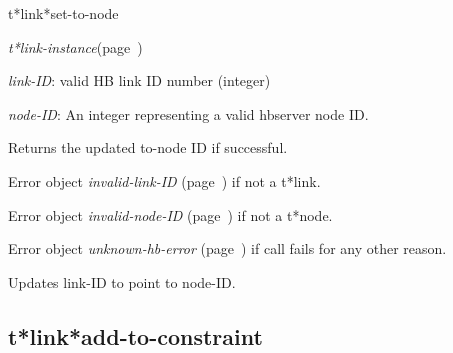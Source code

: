 \begin{description}
\item [Name:]  t*link*set-to-node

\item [Class:] {\sl t*link-instance}\hfill(page~\pageref{t*link-instance})

\item [Parameters:]
\item {\sl link-ID}:  
valid HB link ID number (integer)

\item {\sl node-ID}:   An integer representing
a valid hbserver node ID.


\item [Return-value:]
Returns the updated to-node ID if successful.

Error object {\sl invalid-link-ID} (page~\pageref{invalid-link-ID}) if not a t*link.

Error object {\sl invalid-node-ID} (page~\pageref{invalid-node-ID}) if not a t*node.

Error object {\sl unknown-hb-error} (page~\pageref{unknown-hb-error}) if call fails
for any other reason.

\item [Description:]

Updates link-ID to point to node-ID.

\item [Public:]



\end{description}
\horizontalline

\subsection{t*link*add-to-constraint}
\label{t*link*add-to-constraint}

